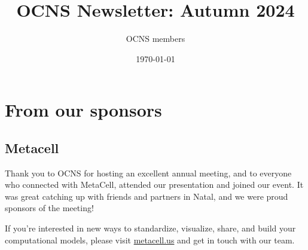 \documentclass[11pt,a4paper,twoside]{article}
\title{OCNS Newsletter: Autumn 2024}
\author{OCNS members}
\date{\today}
\begin{document}
\maketitle
\tableofcontents

\section{From our sponsors}%
\subsection{Metacell}%
\begin{displayquote}
  Thank you to OCNS for hosting an excellent annual meeting, and to everyone who connected with MetaCell, attended our presentation and joined our event.
  It was great catching up with friends and partners in Natal, and we were proud sponsors of the meeting!

  If you're interested in new ways to standardize, visualize, share, and build your computational models, please visit \url{metacell.us} and get in touch with our team.
\end{displayquote}
\end{document}
